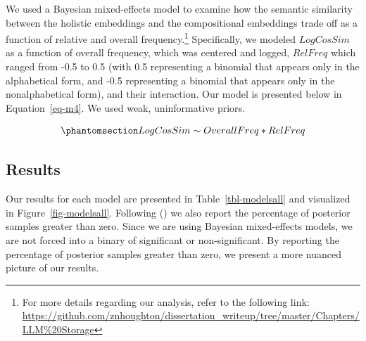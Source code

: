 \documentclass[
  12pt,
  letterpaper,
]{scrreprt}
\begin{document}
We used a Bayesian mixed-effects model to examine how the semantic
similarity between the holistic embeddings and the compositional
embeddings trade off as a function of relative and overall
frequency.\footnote{For more details regarding our analysis, refer to
  the following link:
  \url{https://github.com/znhoughton/dissertation_writeup/tree/master/Chapters/LLM\%20Storage}}
Specifically, we modeled \(LogCosSim\) as a function of overall
frequency, which was centered and logged, \(RelFreq\) which ranged from
-0.5 to 0.5 (with 0.5 representing a binomial that appears only in the
alphabetical form, and -0.5 representing a binomial that appears only in
the nonalphabetical form), and their interaction. Our model is presented
below in Equation~\ref{eq-m4}. We used weak, uninformative priors.

\begin{equation}\phantomsection\label{eq-m4}{
LogCosSim \sim OverallFreq*RelFreq
}\end{equation}

\subsection{Results}\label{results-8}

Our results for each model are presented in Table~\ref{tbl-modelsall}
and visualized in Figure~\ref{fig-modelsall}. Following
() we also report the percentage of posterior samples
greater than zero. Since we are using Bayesian mixed-effects models, we
are not forced into a binary of significant or non-significant. By
reporting the percentage of posterior samples greater than zero, we
present a more nuanced picture of our results.
\end{document}
